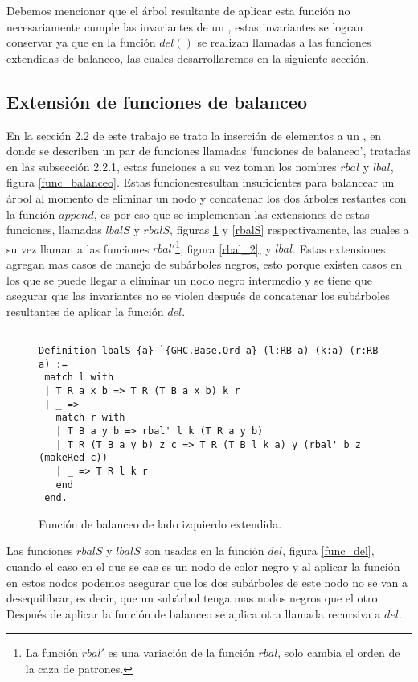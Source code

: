 Debemos mencionar que el \'arbol resultante de aplicar esta funci\'on no necesariamente cumple las
invariantes de un {\arn}, estas invariantes se logran conservar ya que en la funci\'on $del()$ se
realizan llamadas a las funciones extendidas de balanceo, las cuales desarrollaremos en la
siguiente sección.

\subsection{Extensi\'on de funciones de balanceo}

En la secci\'on 2.2 de este trabajo se trato la inserci\'on de elementos a un {\arn}, en donde se
describen un par de funciones llamadas `funciones de balanceo', tratadas en las subsecci\'on
2.2.1, estas funciones a su vez toman los nombres $rbal$ y $lbal$, figura \ref{func_balanceo}.
Estas funcionesresultan insuficientes para balancear un \'arbol al momento de eliminar un nodo y
concatenar los dos \'arboles restantes con la función $append$, es por eso que se implementan las
extensiones de estas funciones, llamadas $lbalS$ y $rbalS$, figuras \ref{lbalS} y \ref{rbalS}
respectivamente, las cuales a su vez llaman a las funciones $rbal'$\footnote{La funci\'on $rbal'$
es una variación de la función $rbal$, solo cambia el orden de la caza de patrones.}, figura
\ref{rbal_2}, y $lbal$. Estas extensiones agregan mas casos de manejo de subárboles negros, esto
porque existen casos en los que se puede llegar a eliminar un nodo negro intermedio y se tiene que
asegurar que las invariantes no se violen después de concatenar los subárboles resultantes de
aplicar la función $del$.

\begin{figure}
\centering
\captionsetup{justification=centering}
\begin{verbatim}

Definition lbalS {a} `{GHC.Base.Ord a} (l:RB a) (k:a) (r:RB a) :=
 match l with
 | T R a x b => T R (T B a x b) k r
 | _ =>
   match r with
   | T B a y b => rbal' l k (T R a y b)
   | T R (T B a y b) z c => T R (T B l k a) y (rbal' b z (makeRed c))
   | _ => T R l k r
   end
 end.

\end{verbatim}
\caption{Funci\'on de balanceo de lado izquierdo extendida.}
\label{lbalS}
\end{figure}

Las funciones $rbalS$ y $lbalS$ son usadas en la funci\'on $del$, figura \ref{func_del}, cuando el
caso en el que se cae es un nodo de color negro y al aplicar la funci\'on en estos nodos podemos
asegurar que los dos subárboles de este nodo no se van a desequilibrar, es decir, que un subárbol
tenga mas nodos negros que el otro. Después de aplicar la función de balanceo se aplica otra llamada
recursiva a $del$.


